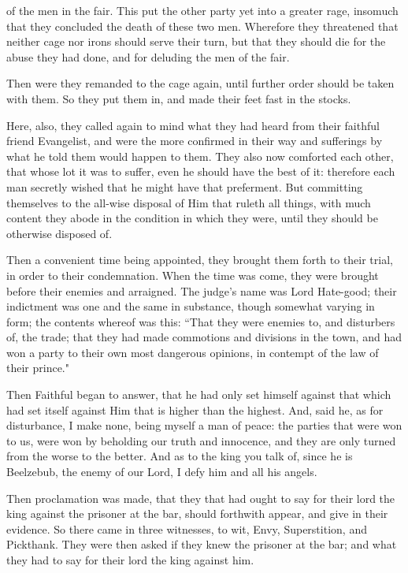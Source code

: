of the men in the fair. This put the other party yet into a greater rage, insomuch that they concluded the death of these two men. Wherefore they threatened that neither cage nor irons should serve their turn, but that they should die for the abuse they had done, and for deluding the men of the fair.

Then were they remanded to the cage again, until further order should be taken with them. So they put them in, and made their feet fast in the stocks.

Here, also, they called again to mind what they had heard from their faithful friend Evangelist, and were the more confirmed in their way and sufferings by what he told them would happen to them. They also now comforted each other, that whose lot it was to suffer, even he should have the best of it: therefore each man secretly wished that he might have that preferment. But committing themselves to the all-wise disposal of Him that ruleth all things, with much content they abode in the condition in which they were, until they should be otherwise disposed of.

Then a convenient time being appointed, they brought them forth to their trial, in order to their condemnation. When the time was come, they were brought before their enemies and arraigned. The judge's name was Lord Hate-good; their indictment was one and the same in substance, though somewhat varying in form; the contents whereof was this: ``That they were enemies to, and disturbers of, the trade; that they had made commotions and divisions in the town, and had won a party to their own most dangerous opinions, in contempt of the law of their prince."

Then Faithful began to answer, that he had only set himself against that which had set itself against Him that is higher than the highest. And, said he, as for disturbance, I make none, being myself a man of peace: the parties that were won to us, were won by beholding our truth and innocence, and they are only turned from the worse to the better. And as to the king you talk of, since he is Beelzebub, the enemy of our Lord, I defy him and all his angels.

Then proclamation was made, that they that had ought to say for their lord the king against the prisoner at the bar, should forthwith appear, and give in their evidence. So there came in three witnesses, to wit, Envy, Superstition, and Pickthank. They were then asked if they knew the prisoner at the bar; and what they had to say for their lord the king against him.

